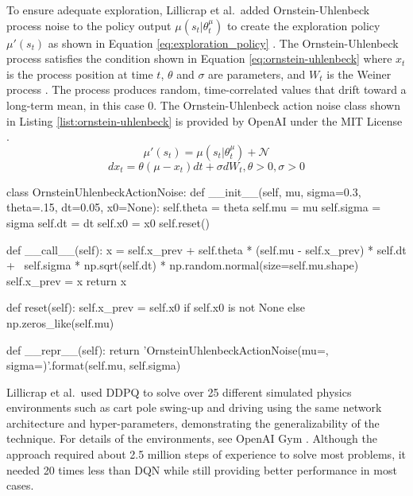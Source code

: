 To ensure adequate exploration, Lillicrap et al.\ added Ornstein-Uhlenbeck process noise to the policy output $\mu(s_t | \theta^\mu_t)$ to create the exploration policy $\mu'(s_t)$ as shown in Equation \ref{eq:exploration_policy} \cite{lillicrap_2016}. The Ornstein-Uhlenbeck process satisfies the condition shown in Equation \ref{eq:ornstein-uhlenbeck} where $x_t$ is the process position at time $t$, $\theta$ and $\sigma$ are parameters, and $W_t$ is the Weiner process \cite{uhlenbeck_ornstein}. The process produces random, time-correlated values that drift toward a long-term mean, in this case 0. The Ornstein-Uhlenbeck action noise class shown in Listing \ref{list:ornstein-uhlenbeck} is provided by OpenAI under the MIT License \cite{ddpg_noise}.
\begin{equation}
\label{eq:exploration_policy}
\mu'(s_t) = \mu(s_t | \theta^\mu_t) + \mathcal{N}
\end{equation}
\begin{equation}
\label{eq:ornstein-uhlenbeck}
dx_t = \theta(\mu-x_t) dt + \sigma dW_t, \theta>0, \sigma>0
\end{equation}
\begin{python}[caption={Ornstein-Uhlenbeck Action Noise \cite{ddpg_noise}},label={list:ornstein-uhlenbeck}]
class OrnsteinUhlenbeckActionNoise:
    def __init__(self, mu, sigma=0.3, theta=.15, dt=0.05, x0=None):
        self.theta = theta
        self.mu = mu
        self.sigma = sigma
        self.dt = dt
        self.x0 = x0
        self.reset()

    def __call__(self):
        x = self.x_prev + self.theta * (self.mu - self.x_prev) * self.dt + \
                self.sigma * np.sqrt(self.dt) * np.random.normal(size=self.mu.shape)
        self.x_prev = x
        return x

    def reset(self):
        self.x_prev = self.x0 if self.x0 is not None else np.zeros_like(self.mu)

    def __repr__(self):
        return 'OrnsteinUhlenbeckActionNoise(mu={}, sigma={})'.format(self.mu, self.sigma)
\end{python}

Lillicrap et al.\ used DDPQ to solve over 25 different simulated physics environments such as cart pole swing-up and driving using the same network architecture and hyper-parameters, demonstrating the generalizability of the technique. For details of the environments, see OpenAI Gym \cite{openaigym}. Although the approach required about 2.5 million steps of experience to solve most problems, it needed 20 times less than DQN while still providing better performance in most cases.

